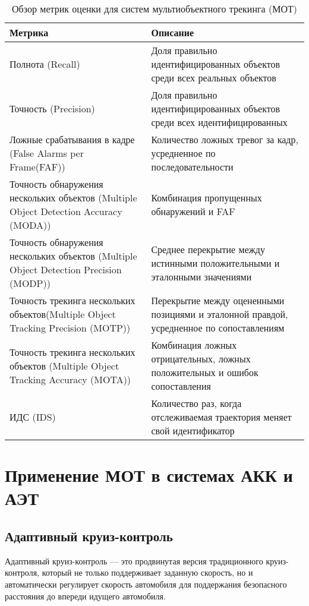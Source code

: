 \begin{table}[H]
	\centering
	\caption{Обзор метрик оценки для систем мультиобъектного трекинга (МОТ)}
	\label{metrics}
	\begin{tabularx}{\textwidth}{|X|X|}
		\hline
		Метрика & Описание\\ 
		\hline
		Полнота (Recall) & Доля правильно идентифицированных объектов среди всех реальных объектов \\
		\hline
		Точность (Precision) & Доля правильно идентифицированных объектов среди всех идентифицированных\\
		\hline
		Ложные срабатывания в кадре (False Alarms per Frame(FAF)) & Количество ложных тревог за кадр, усредненное по последовательности \\
		\hline
		Точность обнаружения нескольких объектов (Multiple Object Detection Accuracy (MODA)) & Комбинация пропущенных обнаружений и FAF \\
		\hline
		Точность обнаружения нескольких объектов (Multiple Object Detection Precision (MODP)) & Среднее перекрытие между истинными положительными и эталонными значениями \\
		\hline
		Точность трекинга нескольких объектов(Multiple Object Tracking Precision (MOTP)) & 
		Перекрытие между оцененными позициями и эталонной правдой, усредненное по сопоставлениям  \\ 
		\hline
		Точность трекинга нескольких объектов (Multiple Object Tracking Accuracy (MOTA)) & Комбинация ложных отрицательных, ложных положительных и ошибок сопоставления \\
		\hline
		ИДС (IDS) & Количество раз, когда отслеживаемая траектория меняет свой идентификатор \\
		\hline
	\end{tabularx}
\end{table}


\chapter{Применение МОТ в системах АКК и АЭТ}

\section{Адаптивный круиз-контроль}
Адаптивный круиз-контроль --- это продвинутая версия традиционного круиз-контроля, который не только поддерживает заданную скорость, но и автоматически регулирует скорость автомобиля для поддержания безопасного расстояния до впереди идущего автомобиля.

